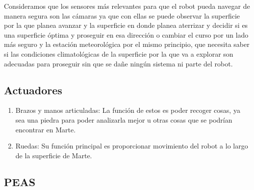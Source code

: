 \documentclass{article}
\begin{document}
        Consideramos que los sensores más relevantes para que el robot pueda navegar de manera segura son las cámaras ya que con ellas se puede observar la superficie por la que planea avanzar y la superficie en donde planea aterrizar y decidir si es una superficie óptima y proseguir en esa dirección o cambiar el curso por un lado más seguro y la estación meteorológica por el mismo principio, que necesita saber si las condiciones climatológicas de la superficie por la que va a explorar son adecuadas para proseguir sin que se dañe ningún sistema ni parte del robot.

        \subsection{Actuadores}
            \begin{enumerate}
                \item Brazos y manos articuladas: La función de estos es poder recoger cosas, ya sea una piedra para poder analizarla mejor u otras cosas que se podrían encontrar en Marte. 
                \item Ruedas: Su función principal es proporcionar movimiento del robot a lo largo de la superficie de Marte.
            \end{enumerate}

        \subsection{PEAS}
\end{document}
